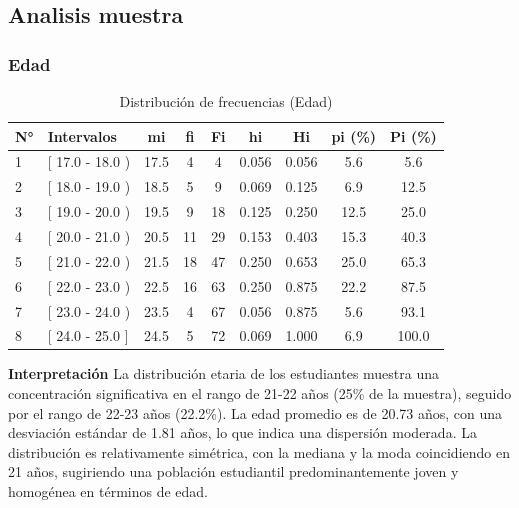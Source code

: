 \documentclass[12pt, a4paper]{article}
\begin{document}
\subsection{Analisis muestra}

\subsubsection{Edad}

\begin{table}[H]

    \begin{tabular}{llccccccc}
        \toprule
        \textbf{N°} & \textbf{Intervalos} & \textbf{mi} & \textbf{fi} & \textbf{Fi} & \textbf{hi} & \textbf{Hi} & \textbf{pi (\%)} & \textbf{Pi (\%)} \\
        \midrule
        1 & [ 17.0 - 18.0 ) & 17.5 & 4  & 4  & 0.056 & 0.056 & 5.6  & 5.6  \\
        2 & [ 18.0 - 19.0 ) & 18.5 & 5  & 9  & 0.069 & 0.125 & 6.9  & 12.5 \\
        3 & [ 19.0 - 20.0 ) & 19.5 & 9  & 18 & 0.125 & 0.250 & 12.5 & 25.0 \\
        4 & [ 20.0 - 21.0 ) & 20.5 & 11 & 29 & 0.153 & 0.403 & 15.3 & 40.3 \\
        5 & [ 21.0 - 22.0 ) & 21.5 & 18 & 47 & 0.250 & 0.653 & 25.0 & 65.3 \\
        6 & [ 22.0 - 23.0 ) & 22.5 & 16 & 63 & 0.250 & 0.875 & 22.2 & 87.5 \\
        7 & [ 23.0 - 24.0 ) & 23.5 & 4  & 67 & 0.056 & 0.875 & 5.6  & 93.1 \\
        8 & [ 24.0 - 25.0 ] & 24.5 & 5  & 72 & 0.069 & 1.000 & 6.9  & 100.0 \\
        \bottomrule
    \end{tabular}
    \vspace{0.1cm}
    \centering
    \caption{Distribución de frecuencias (Edad)}
    \label{tab:frecuencias}
\end{table}

\textbf{Interpretación}
La distribución etaria de los estudiantes muestra una concentración significativa en el rango de 21-22 años (25\% de la muestra), seguido por el rango de 22-23 años (22.2\%). La edad promedio es de 20.73 años, con una desviación estándar de 1.81 años, lo que indica una dispersión moderada. La distribución es relativamente simétrica, con la mediana y la moda coincidiendo en 21 años, sugiriendo una población estudiantil predominantemente joven y homogénea en términos de edad.
\end{document}
